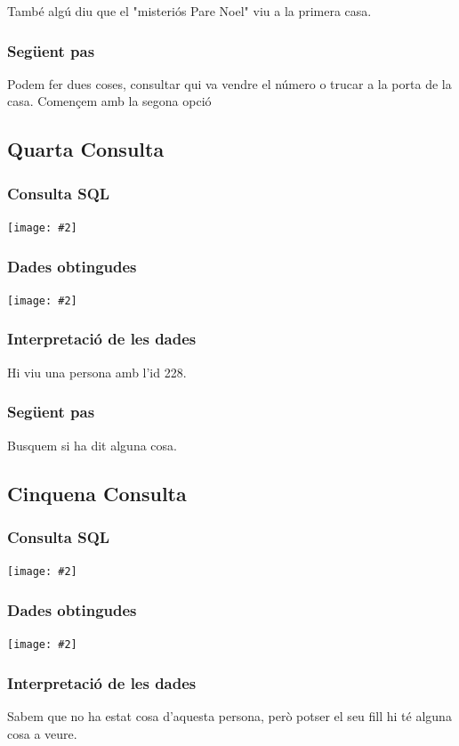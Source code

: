 \documentclass[a4paper,12pt]{article}
\newcommand{\mygraphic}[2][width=\textwidth]{\begin{center}
		\centering\texttt{[image: \#2]}\par
\end{center}}
\begin{document}
També algú diu que el "misteriós Pare Noel" viu a la primera casa.

\subsubsection{Següent pas}
Podem fer dues coses, consultar qui va vendre el número o trucar a la porta de la casa. Començem amb la segona opció

\newpage
\subsection{Quarta Consulta}

\subsubsection{Consulta SQL}
\mygraphic{imatges/7.png}

\subsubsection{Dades obtingudes}
\mygraphic{imatges/8.png}

\subsubsection{Interpretació de les dades}
Hi viu una persona amb l'id 228.

\subsubsection{Següent pas}
Busquem si ha dit alguna cosa.

\newpage
\subsection{Cinquena Consulta}

\subsubsection{Consulta SQL}
\mygraphic{imatges/9.png}

\subsubsection{Dades obtingudes}
\mygraphic{imatges/10.png}

\subsubsection{Interpretació de les dades}
Sabem que no ha estat cosa d'aquesta persona, però potser el seu fill hi té alguna cosa a veure.
\end{document}

